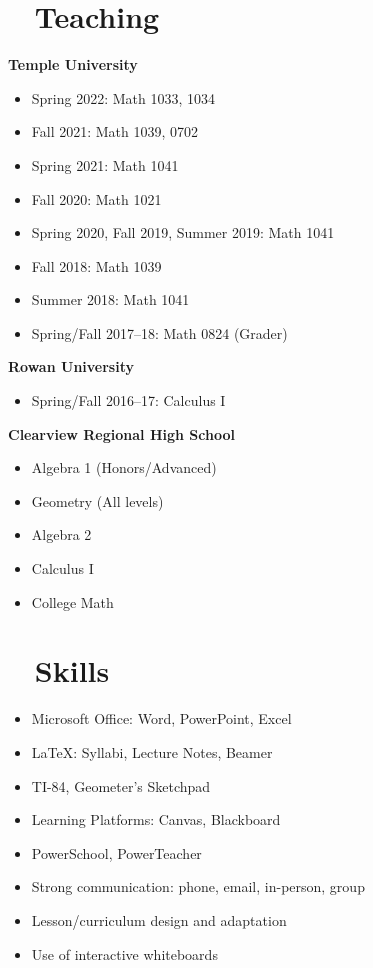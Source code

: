 \documentclass[10pt]{article}
\begin{document}
\section*{\faBookOpen ~ Teaching}
\textbf{Temple University}
\begin{itemize}
    \item Spring 2022: Math 1033, 1034
    \item Fall 2021: Math 1039, 0702
    \item Spring 2021: Math 1041
    \item Fall 2020: Math 1021
    \item Spring 2020, Fall 2019, Summer 2019: Math 1041
    \item Fall 2018: Math 1039
    \item Summer 2018: Math 1041
    \item Spring/Fall 2017--18: Math 0824 (Grader)
\end{itemize}

\textbf{Rowan University}
\begin{itemize}
    \item Spring/Fall 2016--17: Calculus I
\end{itemize}

\textbf{Clearview Regional High School}
\begin{itemize}
    \item Algebra 1 (Honors/Advanced)
    \item Geometry (All levels)
    \item Algebra 2
    \item Calculus I
    \item College Math
\end{itemize}

\section*{\faTools ~ Skills}
\begin{itemize}
    \item Microsoft Office: Word, PowerPoint, Excel
    \item LaTeX: Syllabi, Lecture Notes, Beamer
    \item TI-84, Geometer's Sketchpad
    \item Learning Platforms: Canvas, Blackboard
    \item PowerSchool, PowerTeacher
    \item Strong communication: phone, email, in-person, group
    \item Lesson/curriculum design and adaptation
    \item Use of interactive whiteboards
\end{itemize}
\end{document}
